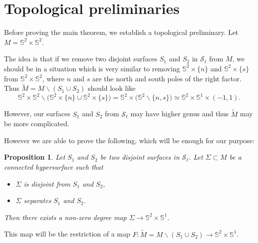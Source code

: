 \documentclass[pdftex]{sigma}
\numberwithin{equation}{section}
\newtheorem{prop}[thm]{Proposition}
{ \theoremstyle{definition}
\newtheorem{dfn}[thm]{Definition}
\newtheorem{Note}[thm]{Note}
\newtheorem{ex}[thm]{Example}
\newtheorem{rem}[thm]{Remark} }
\begin{document}
\section{Topological preliminaries}
\label{sec:topol-prel}

Before proving the main theorem, we establish a topological
preliminary. Let $M=\mathbb{S}^2\times\mathbb{S}^2$.

The idea is that if we remove two disjoint surfaces $S_1$ and $S_2$ in
$\mathcal{S}_\ell$ from $M$, we should be in a situation which is very
similar to removing $\mathbb{S}^2\times\{n\}$ and
$\mathbb{S}^2\times\{s\}$ from $\mathbb{S}^2\times\mathbb{S}^2$, where
$n$ and $s$ are the north and south
poles of the right factor. Thus $\tilde M=M\backslash (S_1\cup S_2)$
should look like
\[\mathbb{S}^2\times\mathbb{S}^2\backslash\big(\mathbb{S}^2\times\{n\}\cup
 \mathbb{S}^2\times\{s\}\big)=\mathbb{S}^2\times
\big(\mathbb{S}^2\backslash\{n,s\}\big)\simeq \mathbb{S}^2\times
 \mathbb{S}^1\times (-1,1).\]

However, our surfaces $S_1$ and $S_2$ from $\mathcal{S}_\ell$ may have
higher genus and thus $\tilde M$ may be more complicated.

However we are able to prove the following, which will be enough for our purpose:

\begin{prop}\label{prop-top}
 Let $S_1$ and $S_2$ be two disjoint surfaces in
 $\mathcal{S}_\ell$. Let $\Sigma\subset M$ be a connected hypersurface such
 that
 \begin{itemize}\itemsep=0pt
 \item $\Sigma$ is disjoint from $S_1$ and $S_2$,
 \item $\Sigma$ separates $S_1$ and $S_2$.
 \end{itemize}
 Then there exists a non-zero degree map $\Sigma\to\mathbb{S}^2\times\mathbb{S}^1$.
\end{prop}
This map will be the restriction of a map $F\colon\tilde M=M\backslash
(S_1\cup S_2)\to \mathbb{S}^2\times\mathbb{S}^1$.
\end{document}
